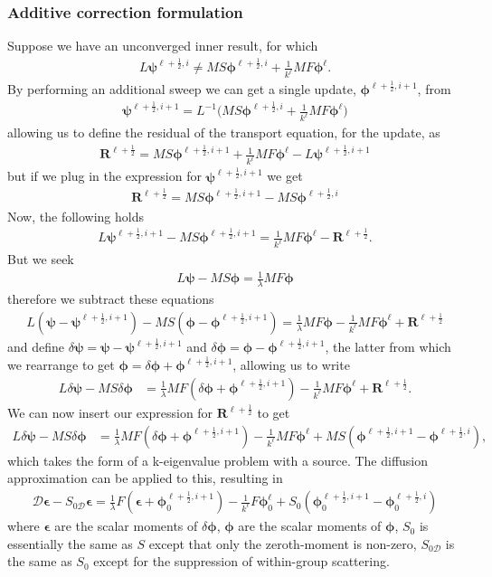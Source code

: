 \documentclass[11pt,letterpaper,notitlepage]{article}
\newcommand{\beqn}{\begin{equation}
		\begin{aligned}}
\newcommand{\eeqn}{\end{aligned}
\end{equation}}
\numberwithin{equation}{section}
\newcommand{\Linv}{L^{-1}}
\newcommand{\bphi}{\boldsymbol{\phi}}
\newcommand{\bpsi}{\boldsymbol{\psi}}
\newcommand{\half}{\frac{1}{2}}
\newcommand{\bepsilon}{\boldsymbol{\epsilon}}
\begin{document}
\subsubsection{Additive correction formulation}
Suppose we have an unconverged inner result, for which
\beqn 
L\bpsi^{\ell+\half,i} \ne
MS\bphi^{\ell+\half, i} + \frac{1}{k^\ell}MF\bphi^\ell.
\eeqn 
By performing an additional sweep we can get a single update, $\bphi^{\ell+\half,i+1}$, from
\beqn 
\bpsi^{\ell+\half,i+1} = \Linv \biggr(
MS\bphi^{\ell+\half, i} + \frac{1}{k^\ell}MF\bphi^\ell
\biggr)
\eeqn 
allowing us to define the residual of the transport equation, for the update, as 
\beqn
\mathbf{R}^{\ell+\half} = MS\bphi^{\ell+\half,i+1} + \frac{1}{k^\ell}MF\bphi^\ell - L \bpsi^{\ell+\half,i+1}
\eeqn 
but if we plug in the expression for $\bpsi^{\ell+\half,i+1}$ we get
\beqn 
\mathbf{R}^{\ell+\half} = MS\bphi^{\ell+\half,i+1} - MS\bphi^{\ell+\half,i}
\eeqn 
\newline 
Now, the following holds
\beqn 
L \bpsi^{\ell+\half,i+1} - MS\bphi^{\ell+\half,i+1} = \frac{1}{k^\ell} MF\bphi^\ell - \mathbf{R}^{\ell+\half}.
\eeqn 
But we seek
\beqn 
L \bpsi - MS\bphi = \frac{1}{\lambda} MF\bphi
\eeqn 
therefore we subtract these equations
\beqn \label{eq:SCDSA-additive-subtracted}
L(\bpsi-\bpsi^{\ell+\half,i+1}) -MS(\bphi - \bphi^{\ell+\half,i+1})= \frac{1}{\lambda} MF\bphi - \frac{1}{k^\ell} MF\bphi^\ell + \mathbf{R}^{\ell + \half}
\eeqn
and define $\delta \bpsi = \bpsi - \bpsi^{\ell+\half,i+1}$ and $\delta \bphi = \bphi - \bphi^{\ell+\half,i+1}$, the latter from which we rearrange to get $\bphi = \delta \bphi + \bphi^{\ell+\half,i+1}$, allowing us to write 
\beqn 
L\delta \bpsi - MS\delta \bphi &= \frac{1}{\lambda}MF(\delta \bphi + \bphi^{\ell+\half,i+1})  - \frac{1}{k^\ell} MF\bphi^\ell + \mathbf{R}^{\ell + \half}.
\eeqn 
We can now insert our expression for $\mathbf{R}^{\ell + \half}$ to get
\beqn 
L\delta \bpsi - MS\delta \bphi &= \frac{1}{\lambda}MF(\delta \bphi + \bphi^{\ell+\half,i+1})  - \frac{1}{k^\ell} MF\bphi^\ell + MS(\bphi^{\ell+\half,i+1} - \bphi^{\ell+\half,i}),
\eeqn
which takes the form of a k-eigenvalue problem with a source. The diffusion approximation can be applied to this, resulting in
\beqn 
\mathcal{D} \bepsilon - S_{0\mathcal{D}} \bepsilon = \frac{1}{\lambda}F(\bepsilon + \bphi_0^{\ell+\half,i+1}) - \frac{1}{k^\ell} F\bphi_0^\ell + S_0(\bphi_0^{\ell+\half,i+1} - \bphi_0^{\ell+\half,i})
\eeqn 
where $\bepsilon$ are the scalar moments of $\delta \bphi$, $\bphi$ are the scalar moments of $\bphi$, $S_0$ is essentially the same as $S$ except that only the zeroth-moment is non-zero, $S_{0\mathcal{D}}$ is the same as $S_0$ except for the suppression of within-group scattering.
\end{document}
